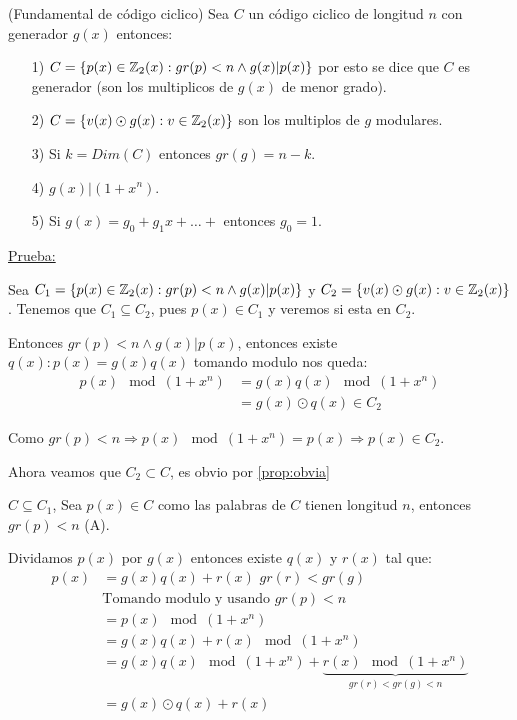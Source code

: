 \documentclass[12pt,a4paper]{article}
\begin{document}
\begin{teorema} (Fundamental de código ciclico) Sea $C$ un código ciclico de 
    longitud $n$ con generador $g(x)$ entonces:
    \begin{itemize}
        \item [1)] $C = \left\lbrace p(x)\in \mathbb{Z}_{2}(x):gr(p)<n \wedge g(x)|p(x) \right\rbrace$ por esto 
            se dice que $C$ es generador (son los multiplicos de $g(x)$ de menor grado).
        \item [2)] $C = \left\lbrace v(x)\odot g(x): v\in \mathbb{Z}_{2}(x) \right\rbrace$ son los multiplos 
            de $g$ modulares.
        \item [3)] Si $k=Dim(C)$ entonces $gr(g)=n-k$.
        \item [4)] $g(x) | (1+x^{n})$.
        \item [5)] Si $g(x) = g_{0} + g_{1}x + \ldots +$ entonces $g_{0}=1$.
    \end{itemize}
\end{teorema}

\underline{Prueba:}
\medskip

Sea $C_{1} = \left\lbrace p(x)\in \mathbb{Z}_{2}(x): gr(p)<n \wedge g(x)|p(x) \right\rbrace$ y
$C_{2} = \left\lbrace v(x)\odot g(x): v\in \mathbb{Z}_{2}(x) \right\rbrace$. Tenemos que 
$C_{1} \subseteq C_{2}$, pues $p(x) \in C_{1}$ y veremos si esta en $C_{2}$.
\medskip

Entonces $gr(p)<n \wedge g(x)|p(x)$, entonces existe $q(x): p(x) = g(x)q(x)$
tomando modulo nos queda:
\begin{align*}
    p(x) \mod (1+x^{n}) &= g(x)q(x)\mod (1+x^{n})\\
    &= g(x) \odot q(x) \in C_{2}
\end{align*}

Como $gr(p) < n \Rightarrow p(x) \mod (1+x^{n}) = p(x) \Rightarrow p(x) \in C_{2}$.
\medskip

Ahora veamos que $C_{2} \subset C$, es obvio por \ref{prop:obvia}
\medskip

$C \subseteq C_{1}$, Sea $p(x) \in C$ como las palabras de $C$ tienen longitud $n$, 
entonces $gr(p) < n$ (A).
\medskip

Dividamos $p(x)$ por $g(x)$ entonces existe $q(x)$ y $r(x)$ tal que:
\begin{align*}
    p(x) &= g(x)q(x) + r(x) \,\, gr(r) < gr(g)\\
    &\text{Tomando modulo y usando $gr(p)<n$}\\
    &= p(x) \mod (1+x^{n})\\
    &= g(x)q(x) + r(x) \mod (1+x^{n})\\
    &= g(x)q(x) \mod (1+x^{n}) + \underbrace{r(x) \mod (1+x^{n})}_{gr(r)<gr(g)<n}\\
    &= g(x) \odot q(x) + r(x)
\end{align*}
\end{document}
